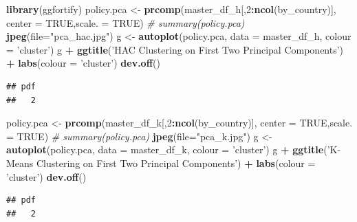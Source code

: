 \documentclass[]{article}
\newenvironment{Shaded}{\begin{snugshade}}{\end{snugshade}}
\newcommand{\CommentTok}[1]{\textcolor[rgb]{0.56,0.35,0.01}{\textit{#1}}}
\newcommand{\DataTypeTok}[1]{\textcolor[rgb]{0.13,0.29,0.53}{#1}}
\newcommand{\DecValTok}[1]{\textcolor[rgb]{0.00,0.00,0.81}{#1}}
\newcommand{\KeywordTok}[1]{\textcolor[rgb]{0.13,0.29,0.53}{\textbf{#1}}}
\newcommand{\NormalTok}[1]{#1}
\newcommand{\OperatorTok}[1]{\textcolor[rgb]{0.81,0.36,0.00}{\textbf{#1}}}
\newcommand{\OtherTok}[1]{\textcolor[rgb]{0.56,0.35,0.01}{#1}}
\newcommand{\StringTok}[1]{\textcolor[rgb]{0.31,0.60,0.02}{#1}}
\begin{document}
\begin{Shaded}
\begin{Highlighting}[]
\KeywordTok{library}\NormalTok{(ggfortify)}
\NormalTok{policy.pca <-}\StringTok{ }\KeywordTok{prcomp}\NormalTok{(master_df_h[,}\DecValTok{2}\OperatorTok{:}\KeywordTok{ncol}\NormalTok{(by_country)], }\DataTypeTok{center =} \OtherTok{TRUE}\NormalTok{,}\DataTypeTok{scale. =} \OtherTok{TRUE}\NormalTok{)}
\CommentTok{# summary(policy.pca)}
\KeywordTok{jpeg}\NormalTok{(}\DataTypeTok{file=}\StringTok{"pca_hac.jpg"}\NormalTok{)}
\NormalTok{g <-}\StringTok{ }\KeywordTok{autoplot}\NormalTok{(policy.pca, }\DataTypeTok{data =}\NormalTok{ master_df_h, }\DataTypeTok{colour =} \StringTok{'cluster'}\NormalTok{)}
\NormalTok{g }\OperatorTok{+}\StringTok{ }\KeywordTok{ggtitle}\NormalTok{(}\StringTok{'HAC Clustering on First Two Principal Components'}\NormalTok{) }\OperatorTok{+}\StringTok{ }\KeywordTok{labs}\NormalTok{(}\DataTypeTok{colour =} \StringTok{'cluster'}\NormalTok{)}
\KeywordTok{dev.off}\NormalTok{()}
\end{Highlighting}
\end{Shaded}

\begin{verbatim}
## pdf 
##   2
\end{verbatim}

\begin{Shaded}
\begin{Highlighting}[]
\NormalTok{policy.pca <-}\StringTok{ }\KeywordTok{prcomp}\NormalTok{(master_df_k[,}\DecValTok{2}\OperatorTok{:}\KeywordTok{ncol}\NormalTok{(by_country)], }\DataTypeTok{center =} \OtherTok{TRUE}\NormalTok{,}\DataTypeTok{scale. =} \OtherTok{TRUE}\NormalTok{)}
\CommentTok{# summary(policy.pca)}
\KeywordTok{jpeg}\NormalTok{(}\DataTypeTok{file=}\StringTok{"pca_k.jpg"}\NormalTok{)}
\NormalTok{g <-}\StringTok{ }\KeywordTok{autoplot}\NormalTok{(policy.pca, }\DataTypeTok{data =}\NormalTok{ master_df_k, }\DataTypeTok{colour =} \StringTok{'cluster'}\NormalTok{)}
\NormalTok{g }\OperatorTok{+}\StringTok{ }\KeywordTok{ggtitle}\NormalTok{(}\StringTok{'K-Means Clustering on First Two Principal Components'}\NormalTok{) }\OperatorTok{+}\StringTok{ }\KeywordTok{labs}\NormalTok{(}\DataTypeTok{colour =} \StringTok{'cluster'}\NormalTok{)}
\KeywordTok{dev.off}\NormalTok{()}
\end{Highlighting}
\end{Shaded}

\begin{verbatim}
## pdf 
##   2
\end{verbatim}
\end{document}
